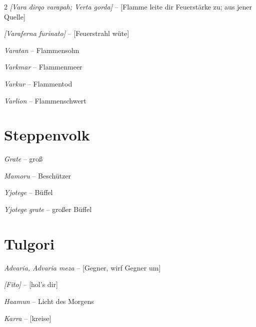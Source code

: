 \documentclass[10pt, a4paper, oneside]{book}
\begin{document}
\begin{multicols}{2}
\textit{[Vara dirqo varapah; Verta gorda]} – [Flamme leite dir Feuerstärke zu; aus jener Quelle]

\textit{[Varaferna furinato]} – [Feuerstrahl wüte]

\textit{Varatan} – Flammensohn

\textit{Varkmar} – Flammenmeer

\textit{Varkur} – Flammentod

\textit{Varlion} – Flammenschwert





\section{Steppenvolk}

\textit{Grate} – groß

\textit{Mamoru} – Beschützer

\textit{Yjotege} – Büffel

\textit{Yjotege grate} – großer Büffel





\section{Tulgori}

\textit{Advaria, Advaria meza} – [Gegner, wirf Gegner um]

\textit{[Fito]} – [hol's dir]

\textit{Haamun} – Licht des Morgens

\textit{Karra} – [kreise]


\end{multicols}
\end{document}
